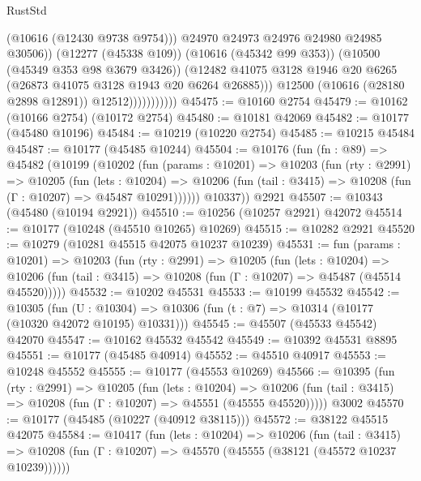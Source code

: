 \begin{lexlean}{RustStd}
\begin{coremodule}
                                  (@10616 (@12430 @9738 @9754)))
                                @24970
                                @24973
                                @24976
                                @24980
                                @24985
                                @30506))
                            (@12277 (@45338 @109))
                            (@10616 (@45342 @99 @353))
                            (@10500 (@45349 @353 @98 @3679 @3426))
                            (@12482
                              @41075
                              @3128
                              @1946
                              @20
                              @6265
                              (@26873 @41075 @3128 @1943 @20 @6264 @26885)))
                          @12500
                          (@10616 (@28180 @2898 @12891))
                          @12512)))))))))))
@45475 := @10160 @2754
@45479 := @10162 (@10166 @2754) (@10172 @2754)
@45480 := @10181 @42069
@45482 := @10177 (@45480 @10196)
@45484 := @10219 (@10220 @2754)
@45485 := @10215 @45484
@45487 := @10177 (@45485 @10244)
@45504 := @10176
    (fun (fn : @89) =>
    @45482
      (@10199
        (@10202
          (fun (params : @10201) =>
          @10203
            (fun (rty : @2991) =>
            @10205
              (fun (lets : @10204) =>
              @10206 (fun (tail : @3415) => @10208 (fun (Γ : @10207) => @45487 @10291))))))
        @10337))
    @2921
@45507 := @10343 (@45480 (@10194 @2921))
@45510 := @10256 (@10257 @2921) @42072
@45514 := @10177 (@10248 (@45510 @10265) @10269)
@45515 := @10282 @2921
@45520 := @10279 (@10281 @45515 @42075 @10237 @10239)
@45531 := fun (params : @10201) =>
  @10203
    (fun (rty : @2991) =>
    @10205
      (fun (lets : @10204) =>
      @10206 (fun (tail : @3415) => @10208 (fun (Γ : @10207) => @45487 (@45514 @45520)))))
@45532 := @10202 @45531
@45533 := @10199 @45532
@45542 := @10305
    (fun (U : @10304) => @10306 (fun (t : @7) => @10314 (@10177 (@10320 @42072 @10195) @10331)))
@45545 := @45507 (@45533 @45542) @42070
@45547 := @10162 @45532 @45542
@45549 := @10392 @45531 @8895
@45551 := @10177 (@45485 @40914)
@45552 := @45510 @40917
@45553 := @10248 @45552
@45555 := @10177 (@45553 @10269)
@45566 := @10395
    (fun (rty : @2991) =>
    @10205
      (fun (lets : @10204) =>
      @10206 (fun (tail : @3415) => @10208 (fun (Γ : @10207) => @45551 (@45555 @45520)))))
    @3002
@45570 := @10177 (@45485 (@10227 (@40912 @38115)))
@45572 := @38122 @45515 @42075
@45584 := @10417
    (fun (lets : @10204) =>
    @10206
      (fun (tail : @3415) =>
      @10208 (fun (Γ : @10207) => @45570 (@45555 (@38121 (@45572 @10237 @10239))))))

\end{coremodule}
\end{lexlean}

